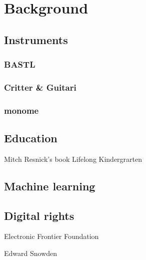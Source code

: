 \chapter{Background}

\section{Instruments}

\subsection{BASTL}

\subsection{Critter \& Guitari}

\subsection{monome}

\section{Education}

Mitch Resnick's book Lifelong Kindergrarten

\section{Machine learning}

\section{Digital rights}

Electronic Frontier Foundation

Edward Snowden
